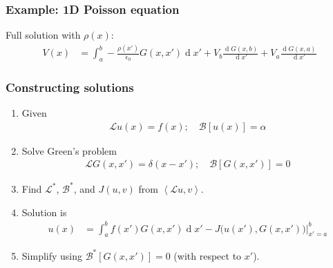 \documentclass[12 pt, compress, handout, intlimits]{beamer}
\renewcommand{\d}{\operatorname{d}\!}
\renewcommand{\L}{\mathcal{L}}
\renewcommand{\B}{\mathcal{B}}
\newcommand{\inprod}[2]{\left\langle {#1}, {#2} \right\rangle}
\renewcommand{\L}{\mathcal{L}}
\begin{document}
\begin{frame}[fragile]
    \frametitle{Example: 1D Poisson equation}
    
    Full solution with $ \rho(x) $:
    \begin{align*}
        V(x) &= \int_a^b - \frac{\rho(x')}{\epsilon_0} G(x,x') \d x' + V_b \frac{\d G(x,b)}{\d x'} + V_a \frac{\d G(x,a)}{\d x'}
    \end{align*}

\end{frame}


\begin{frame}[fragile]
    \frametitle{Constructing solutions}

    \begin{enumerate}
    \item
        Given
        \begin{align*}
            \L u(x) = f(x); \quad \B[u(x)] = \alpha
        \end{align*}
    \item
        Solve Green's problem
        \begin{align*}
            \L G(x,x') = \delta(x - x'); \quad \B[G(x,x')] = 0
        \end{align*}
    \item
        Find $ \L^* $, $ \B^* $, and $ J(u,v) $ from $ \inprod{\L u}{v} $.
    \item
        Solution is
        \begin{align*}
            u(x) &= \int_{a}^{b} f(x') G(x,x') \d x' - J\big( u(x'), G(x,x') \big) \Big|_{x'=a}^b
        \end{align*}
    \item
        Simplify using $ \B^*[G(x,x')] = 0 $ (with respect to $ x' $).
    \end{enumerate}
    
\end{frame}
\end{document}
